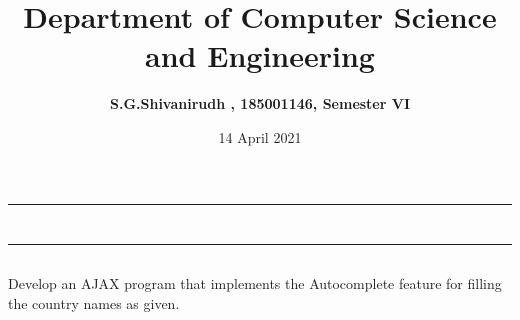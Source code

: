 \documentclass[12pt,letterpaper]{article}
\title{\textbf{Department of Computer Science and Engineering}}
\author{\textbf{S.G.Shivanirudh , 185001146, Semester VI }}
\date{14 April 2021}
\begin{document}
\maketitle
\hrule
\section*{}
\hrule 
\bigskip\bigskip

\subsection*{}

\subsection*{}
\begin{flushleft}
    Develop  an  AJAX  program  that  implements  the  Autocomplete  feature  for  filling the country names as given.
\end{flushleft}

\subsection*{}
\subsubsection*{}
\begin{flushleft}

\end{flushleft}

\subsubsection*{}
\begin{flushleft}

\end{flushleft}

\subsubsection*{}
\subsubsection*{}
\begin{flushleft}

\end{flushleft}
\end{document}
